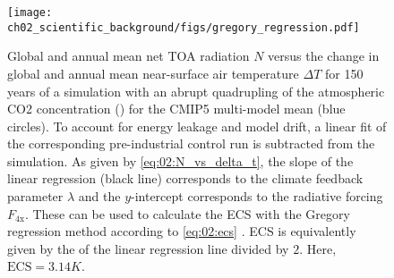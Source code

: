 \begin{figure}[t]
  \centering
  \texttt{[image: 
    ch02\_scientific\_background/figs/gregory\_regression.pdf]}
  \caption{Global and annual mean net \acf{TOA} radiation $N$ versus the change
    in global and annual mean near-surface air temperature $\Delta T$ for 150
    years of a simulation with an abrupt quadrupling of the atmospheric
    \acs{CO2} concentration () for the \acs{CMIP}5 multi-model mean
    (blue circles). To account for energy leakage and model drift, a linear
    fit of the corresponding pre-industrial control run is subtracted from the
     simulation. As given by \cref{eq:02:N_vs_delta_t}, the slope
    of the linear regression (black line) corresponds to the climate feedback
    parameter $\lambda$ and the $y$-intercept corresponds to the radiative
    forcing $F_\text{4x}$. These can be used to calculate the \acf{ECS} with
    the Gregory regression method according to \cref{eq:02:ecs}
    \autocite{Gregory2004}. \acs{ECS} is equivalently given by the
    \xintercept{} of the linear regression line divided by $2$. Here,
    $\text{ECS} = 3.14 \unit{K}$.}
  \label{fig:02:gregory_regression}
\end{figure}

